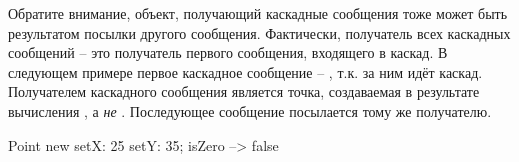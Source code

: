 \documentclass[a4paper,10pt,twoside]{book}
\begin{document}
Обратите внимание, объект, получающий каскадные сообщения тоже может быть результатом посылки другого сообщения.
Фактически, получатель всех каскадных сообщений -- это получатель первого сообщения, входящего в каскад. В следующем примере первое каскадное сообщение -- , т.к. за ним идёт каскад. Получателем каскадного сообщения  является точка, создаваемая в результате вычисления , а \emph{не} . Последующее сообщение  посылается тому же получателю.

\begin{code}{}
Point new setX: 25 setY: 35; isZero --> false
\end{code}

\end{document}
